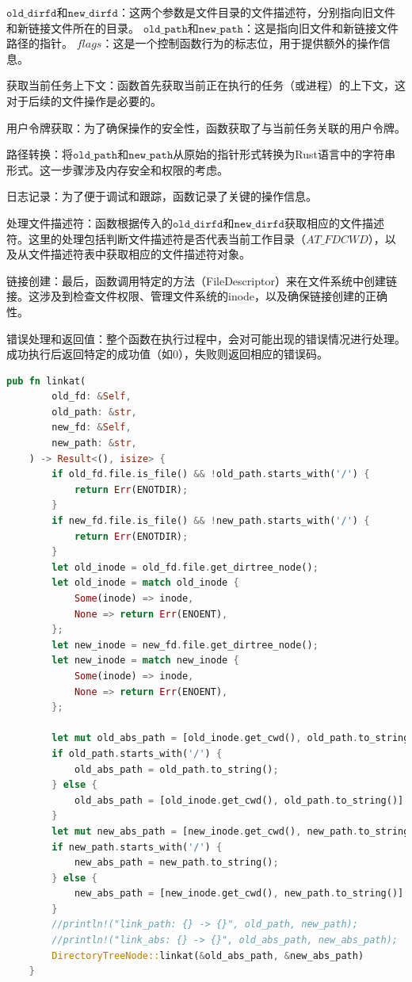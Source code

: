 $\texttt{old\_dirfd}$和$\texttt{new\_dirfd}$：这两个参数是文件目录的文件描述符，分别指向旧文件和新链接文件所在的目录。
$\texttt{old\_path}$和$\texttt{new\_path}$：这是指向旧文件和新链接文件路径的指针。
$flags$：这是一个控制函数行为的标志位，用于提供额外的操作信息。

获取当前任务上下文：函数首先获取当前正在执行的任务（或进程）的上下文，这对于后续的文件操作是必要的。

用户令牌获取：为了确保操作的安全性，函数获取了与当前任务关联的用户令牌。

路径转换：将$\texttt{old\_path}$和$\texttt{new\_path}$从原始的指针形式转换为Rust语言中的字符串形式。这一步骤涉及内存安全和权限的考虑。

日志记录：为了便于调试和跟踪，函数记录了关键的操作信息。

处理文件描述符：函数根据传入的$\texttt{old\_dirfd}$和$\texttt{new\_dirfd}$获取相应的文件描述符。这里的处理包括判断文件描述符是否代表当前工作目录（$AT\_FDCWD$），以及从文件描述符表中获取相应的文件描述符对象。

链接创建：最后，函数调用特定的方法（FileDescriptor）来在文件系统中创建链接。这涉及到检查文件权限、管理文件系统的inode，以及确保链接创建的正确性。

错误处理和返回值：整个函数在执行过程中，会对可能出现的错误情况进行处理。成功执行后返回特定的成功值（如0），失败则返回相应的错误码。

\begin{lstlisting}[language=rust]
pub fn linkat(
        old_fd: &Self,
        old_path: &str,
        new_fd: &Self,
        new_path: &str,
    ) -> Result<(), isize> {
        if old_fd.file.is_file() && !old_path.starts_with('/') {
            return Err(ENOTDIR);
        }
        if new_fd.file.is_file() && !new_path.starts_with('/') {
            return Err(ENOTDIR);
        }
        let old_inode = old_fd.file.get_dirtree_node();
        let old_inode = match old_inode {
            Some(inode) => inode,
            None => return Err(ENOENT),
        };
        let new_inode = new_fd.file.get_dirtree_node();
        let new_inode = match new_inode {
            Some(inode) => inode,
            None => return Err(ENOENT),
        };

        let mut old_abs_path = [old_inode.get_cwd(), old_path.to_string()].join("/");
        if old_path.starts_with('/') {
            old_abs_path = old_path.to_string();
        } else {
            old_abs_path = [old_inode.get_cwd(), old_path.to_string()].join("/");
        }
        let mut new_abs_path = [new_inode.get_cwd(), new_path.to_string()].join("/");
        if new_path.starts_with('/') {
            new_abs_path = new_path.to_string();
        } else {
            new_abs_path = [new_inode.get_cwd(), new_path.to_string()].join("/");
        }
        //println!("link_path: {} -> {}", old_path, new_path);
        //println!("link_abs: {} -> {}", old_abs_path, new_abs_path);
        DirectoryTreeNode::linkat(&old_abs_path, &new_abs_path)
    }
\end{lstlisting}

